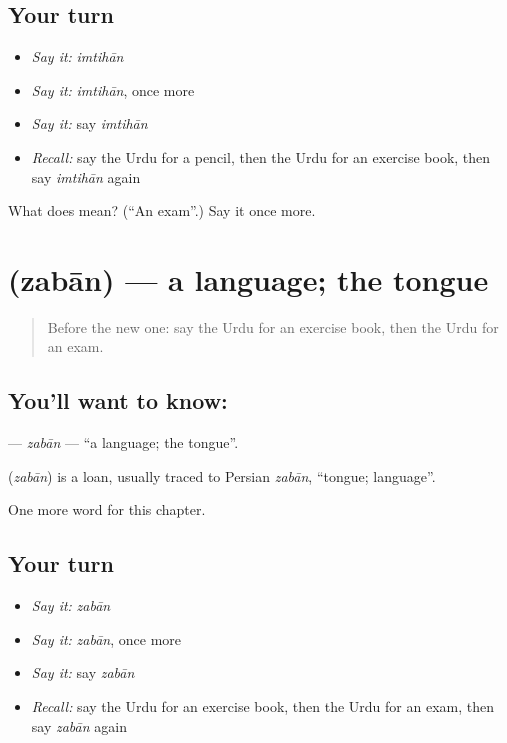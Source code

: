 \subsection*{Your turn}
\begin{itemize}
\raggedright
  \item \emph{Say it:} \emph{imtihān}
  \item \emph{Say it:} \emph{imtihān}, once more
  \item \emph{Say it:} say \emph{imtihān}
  \item \emph{Recall:} say the Urdu for a pencil, then the Urdu for an exercise book, then say \emph{imtihān} again
\end{itemize}

\begin{tcolorbox}[breakable,colback=teal!4,colframe=teal!35!black,title={Before you move on}]
What does  mean? (\textquotedblleft{}An exam\textquotedblright{}.) Say it once more.
\end{tcolorbox}
\section[\texorpdfstring{\ur{زبان} (zabān)}{زبان (zabān)}]{ (zabān) — a language; the tongue}

\label{lesson:UR-C114-zaban}



\begin{quote}
Before the new one: say the Urdu for an exercise book, then the Urdu for an exam.
\end{quote}

\subsection*{You'll want to know: }
\textbf{} — \emph{zabān} — \textquotedblleft{}a language; the tongue\textquotedblright{}.

\begin{cousinweb}
\textbf{} (\emph{zabān}) is a loan, usually traced to Persian \emph{zabān}, \textquotedblleft{}tongue; language\textquotedblright{}.
\end{cousinweb}

\begin{grammarlens}[title={What you've built}]
One more word for this chapter.
\end{grammarlens}

\subsection*{Your turn}
\begin{itemize}
\raggedright
  \item \emph{Say it:} \emph{zabān}
  \item \emph{Say it:} \emph{zabān}, once more
  \item \emph{Say it:} say \emph{zabān}
  \item \emph{Recall:} say the Urdu for an exercise book, then the Urdu for an exam, then say \emph{zabān} again
\end{itemize}

